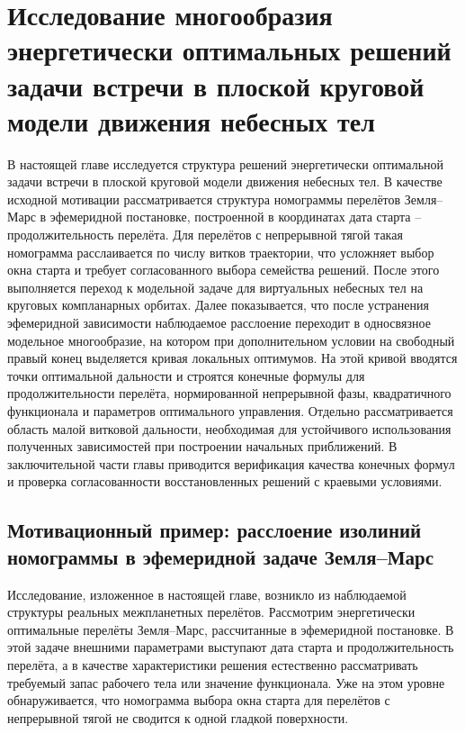 \chapter{Исследование многообразия энергетически оптимальных решений задачи встречи в плоской круговой модели движения небесных тел}

В настоящей главе исследуется структура решений энергетически оптимальной задачи встречи в плоской круговой модели движения небесных тел. В качестве исходной мотивации рассматривается структура номограммы перелётов Земля--Марс в эфемеридной постановке, построенной в координатах дата старта -- продолжительность перелёта. Для перелётов с непрерывной тягой такая номограмма расслаивается по числу витков траектории, что усложняет выбор окна старта и требует согласованного выбора семейства решений. После этого выполняется переход к модельной задаче для виртуальных небесных тел на круговых компланарных орбитах. Далее показывается, что после устранения эфемеридной зависимости наблюдаемое расслоение переходит в односвязное модельное многообразие, на котором при дополнительном условии на свободный правый конец выделяется кривая локальных оптимумов. На этой кривой вводятся точки оптимальной дальности и строятся конечные формулы для продолжительности перелёта, нормированной непрерывной фазы, квадратичного функционала и параметров оптимального управления. Отдельно рассматривается область малой витковой дальности, необходимая для устойчивого использования полученных зависимостей при построении начальных приближений. В заключительной части главы приводится верификация качества конечных формул и проверка согласованности восстановленных решений с краевыми условиями.

\section[Мотивационный пример: расслоение изолиний номограммы в эфемеридной задаче Земля--Марс]{\texorpdfstring{Мотивационный пример: расслоение изолиний номограммы в эфемеридной задаче Земля--Марс}{Мотивационный пример: расслоение изолиний номограммы в эфемеридной задаче Земля--Марс}}

Исследование, изложенное в настоящей главе, возникло из наблюдаемой структуры реальных межпланетных перелётов. Рассмотрим энергетически оптимальные перелёты Земля--Марс, рассчитанные в эфемеридной постановке. В этой задаче внешними параметрами выступают дата старта и продолжительность перелёта, а в качестве характеристики решения естественно рассматривать требуемый запас рабочего тела или значение функционала. Уже на этом уровне обнаруживается, что номограмма выбора окна старта для перелётов с непрерывной тягой не сводится к одной гладкой поверхности.

